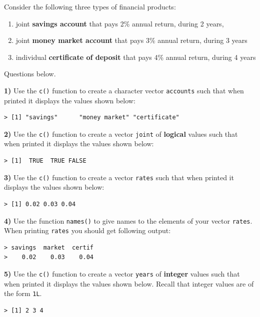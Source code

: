 \documentclass[
]{book}
\begin{document}
Consider the following three types of financial products:

\begin{enumerate}
\def\labelenumi{\alph{enumi})}
\item
  joint \textbf{savings account} that pays 2\% annual return, during 2 years,
\item
  joint \textbf{money market account} that pays 3\% annual return, during 3 years
\item
  individual \textbf{certificate of deposit} that pays 4\% annual return, during 4 years
\end{enumerate}

Questions below.

\textbf{1)} Use the \texttt{c()} function to create a character vector \texttt{accounts} such
that when printed it displays the values shown below:

\begin{verbatim}
> [1] "savings"      "money market" "certificate"
\end{verbatim}

\textbf{2)} Use the \texttt{c()} function to create a vector \texttt{joint} of \textbf{logical} values
such that when printed it displays the values shown below:

\begin{verbatim}
> [1]  TRUE  TRUE FALSE
\end{verbatim}

\textbf{3)} Use the \texttt{c()} function to create a vector \texttt{rates} such that when
printed it displays the values shown below:

\begin{verbatim}
> [1] 0.02 0.03 0.04
\end{verbatim}

\textbf{4)} Use the function \texttt{names()} to give names to the elements of your vector \texttt{rates}. When printing \texttt{rates} you should get following output:

\begin{verbatim}
> savings  market  certif 
>    0.02    0.03    0.04
\end{verbatim}

\textbf{5)} Use the \texttt{c()} function to create a vector \texttt{years} of \textbf{integer}
values such that when printed it displays the values shown below. Recall
that integer values are of the form \texttt{1L}.

\begin{verbatim}
> [1] 2 3 4
\end{verbatim}
\end{document}
